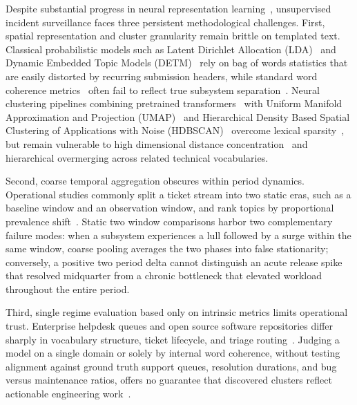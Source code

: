 \documentclass[sigconf,anonymous,pbalance]{acmart}
\begin{document}
Despite substantial progress in neural representation learning~\cite{devlin2019bert, reimers2019sentence, wang2020minilm}, unsupervised incident surveillance faces three persistent methodological challenges. First, spatial representation and cluster granularity remain brittle on templated text. Classical probabilistic models such as Latent Dirichlet Allocation (LDA)~\cite{blei2003latent} and Dynamic Embedded Topic Models (DETM)~\cite{dieng2020dynamic} rely on bag of words statistics that are easily distorted by recurring submission headers, while standard word coherence metrics~\cite{newman2010automatic, roder2015exploring} often fail to reflect true subsystem separation~\cite{hoyle2021automated}. Neural clustering pipelines combining pretrained transformers~\cite{reimers2019sentence, sia2020tired} with Uniform Manifold Approximation and Projection (UMAP)~\cite{mcinnes2018umap} and Hierarchical Density Based Spatial Clustering of Applications with Noise (HDBSCAN)~\cite{campello2013density, mcinnes2017hdbscan} overcome lexical sparsity~\cite{grootendorst2022bertopic, bianchi2021pre}, but remain vulnerable to high dimensional distance concentration~\cite{beyer1999nearest} and hierarchical overmerging across related technical vocabularies.

Second, coarse temporal aggregation obscures within period dynamics. Operational studies commonly split a ticket stream into two static eras, such as a baseline window and an observation window, and rank topics by proportional prevalence shift~\cite{chen2020incidental, dieng2020dynamic, grootendorst2022bertopic}. Static two window comparisons harbor two complementary failure modes: when a subsystem experiences a lull followed by a surge within the same window, coarse pooling averages the two phases into false stationarity; conversely, a positive two period delta cannot distinguish an acute release spike that resolved midquarter from a chronic bottleneck that elevated workload throughout the entire period.

Third, single regime evaluation based only on intrinsic metrics limits operational trust. Enterprise helpdesk queues and open source software repositories differ sharply in vocabulary structure, ticket lifecycle, and triage routing~\cite{agarwal2012identifying, vogel2024itsm, lhoest2021datasets}. Judging a model on a single domain or solely by internal word coherence, without testing alignment against ground truth support queues, resolution durations, and bug versus maintenance ratios, offers no guarantee that discovered clusters reflect actionable engineering work~\cite{hoyle2021automated, chen2020incidental}.
\end{document}
